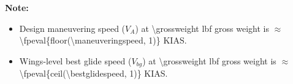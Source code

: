 \begin{table}[H]
    \textbf{Note:}
    \begin{itemize}
        \item Design maneuvering speed ($V_A$) at \num{\grossweight} lbf gross weight is $\approx$ \num{\fpeval{floor(\maneuveringspeed, 1)}} KIAS.
        \item Wings-level best glide speed ($V_{bg}$) at \num{\grossweight} lbf gross weight is $\approx$ \num{\fpeval{ceil(\bestglidespeed, 1)}} KIAS.
    \end{itemize}
\end{table}


